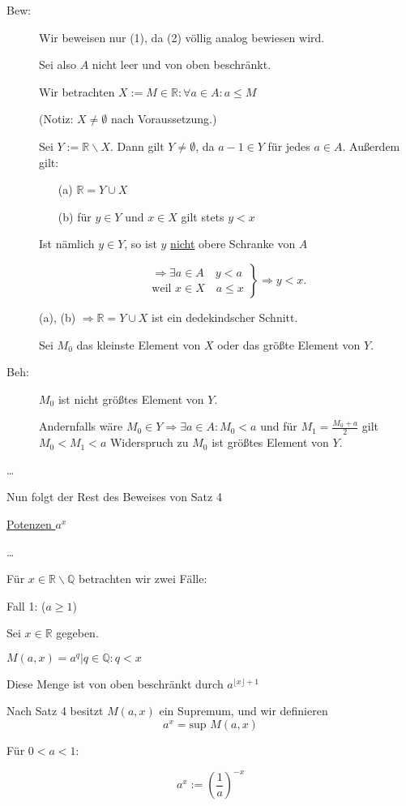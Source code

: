 \documentclass[12pt,a4paper,leqno]{article}
\begin{document}
\begin{description}

\item[Bew:] 

Wir beweisen nur (1), da (2) völlig analog bewiesen wird.

Sei also $A$ nicht leer und von oben beschränkt.

Wir betrachten $X:= { M \in \mathbb{R} : \forall a \in A : a \leq M }$

(Notiz: $X \neq \emptyset$ nach Voraussetzung.)

Sei $Y := \mathbb{R} \backslash X$. Dann gilt $Y \neq \emptyset$, da $a - 1 \in Y$ für jedes $a \in A$.
Außerdem gilt: 
\begin{itemize}
\item[(a)] $\mathbb{R} = Y \cup X$
\item[(b)] für $y \in Y$ und $x \in X$ gilt stets $y < x$
\end{itemize}

Ist nämlich $y \in Y$, so ist $y$ \underline{nicht} obere Schranke von $A$

$$
\left.
\begin{array}{l}
\Rightarrow \exists a \in A \quad y < a \\
\textrm{weil } x \in X \quad a \leq x
\end{array}
\right\} \Rightarrow y < x. $$

(a), (b) $\Rightarrow \mathbb{R} = Y \cup X$ ist ein dedekindscher Schnitt.

Sei $M_0$ das kleinste Element von $X$ oder das größte Element von $Y$.

\item[Beh:] $M_0$ ist nicht größtes Element von $Y$.

Andernfalls wäre $M_0 \in Y \Rightarrow \exists a \in A : M_0 < a$  und für $M_1 = \frac{M_0 + a}{2}$ gilt $M_0 < M_1 < a$ Widerspruch zu $M_0$ ist größtes Element von $Y$.
\end{description}



\ldots

Nun folgt der Rest des Beweises von Satz 4

\underline{Potenzen $a^x$}

\ldots


Für $x \in \mathbb{R} \backslash \mathbb{Q}$ betrachten wir zwei Fälle:

Fall 1: ($a \geq 1$)

Sei $x \in \mathbb{R}$ gegeben.


$M(a, x) = { a^q | q \in \mathbb{Q} : q < x }$

Diese Menge ist von oben beschränkt durch $a^{\lfloor x \rfloor + 1}$ %

Nach Satz 4 besitzt $M(a, x)$ ein Supremum, und wir definieren 
$$a^x = \textrm{sup } M(a,x)$$

Für $0 < a < 1$:

$$a^x := \left( \frac{1}{a} \right) ^{-x}$$
\end{document}

